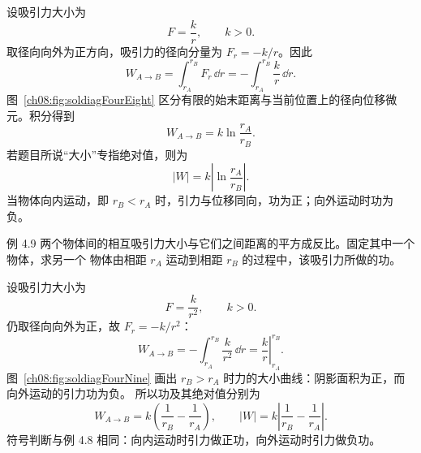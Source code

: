 \begin{xesolution}
设吸引力大小为
\[
 F=\frac{k}{r},
 \qquad k>0.
\]
取径向向外为正方向，吸引力的径向分量为 $F_r=-k/r$。因此
\[
 W_{A\to B}
 =\int_{r_A}^{r_B}F_r\,\dd r
 =-\int_{r_A}^{r_B}\frac{k}{r}\,\dd r.
\]
\soldiagFourEight
图~\ref{ch08:fig:soldiagFourEight} 区分有限的始末距离与当前位置上的径向位移微元。积分得到
\[
 \boxed{W_{A\to B}=k\ln\frac{r_A}{r_B}}.
\]
若题目所说“大小”专指绝对值，则为
\[
 \boxed{|W|=k\left|\ln\frac{r_A}{r_B}\right|}.
\]
当物体向内运动，即 $r_B<r_A$ 时，引力与位移同向，功为正；向外运动时功为负。
\end{xesolution}

\begin{origexamplebox}{例 4.9}
两个物体间的相互吸引力大小与它们之间距离的平方成反比。固定其中一个物体，求另一个
物体由相距 $r_A$ 运动到相距 $r_B$ 的过程中，该吸引力所做的功。
\end{origexamplebox}

\begin{xesolution}
设吸引力大小为
\[
 F=\frac{k}{r^2},
 \qquad k>0.
\]
仍取径向向外为正，故 $F_r=-k/r^2$：
\[
 W_{A\to B}
 =-\int_{r_A}^{r_B}\frac{k}{r^2}\,\dd r
 =\left.\frac{k}{r}\right|_{r_A}^{r_B}.
\]
\soldiagFourNine
图~\ref{ch08:fig:soldiagFourNine} 画出 $r_B>r_A$ 时力的大小曲线：阴影面积为正，而向外运动的引力功为负。
所以功及其绝对值分别为
\[
\boxed{
 W_{A\to B}=k\left(\frac1{r_B}-\frac1{r_A}\right)},
\qquad
\boxed{
 |W|=k\left|\frac1{r_B}-\frac1{r_A}\right|}.
\]
符号判断与例 4.8 相同：向内运动时引力做正功，向外运动时引力做负功。
\end{xesolution}
